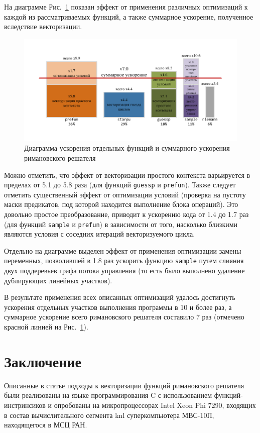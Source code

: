 \documentclass[utf8]{psta}
\begin{document}
На диаграмме Рис.~\ref{pic:perf} показан эффект от применения различных оптимизаций к каждой из рассматриваемых функций, а также суммарное ускорение, полученное вследствие векторизации.

\begin{figure}
\includegraphics[width=12cm]{pics/pic_perf}
\caption{Диаграмма ускорения отдельных функций и суммарного ускорения римановского решателя}
\label{pic:perf}
\end{figure}

Можно отметить, что эффект от векторизации простого контекста варьируется в пределах от 5.1 до 5.8 раза (для функций \texttt{guessp} и \texttt{prefun}).
Также следует отметить существенный эффект от оптимизации условий (проверка на пустоту маски предикатов, под которой находится выполнение блока операций).
Это довольно простое преобразование, приводит к ускорению кода от 1.4 до 1.7 раз (для функций \texttt{sample} и \texttt{prefun}) в зависимости от того, насколько близкими являются условия с соседних итераций векторизуемого цикла.

Отдельно на диаграмме выделен эффект от применения оптимизации замены переменных, позволившей в 1.8 раз ускорить функцию \texttt{sample} путем слияния двух поддеревьев графа потока управления (то есть было выполнено удаление дублирующих линейных участков).

В результате применения всех описанных оптимизаций удалось достигнуть ускорения отдельных участков выполнения программы в 10 и более раз, а суммарное ускорение всего римановского решателя составило 7 раз (отмечено красной линией на Рис.~\ref{pic:perf}).

\section*{Заключение}

Описанные в статье подходы к векторизации функций римановского решателя были реализованы на языке программирования C с использованием функций-инстринсиков и опробованы на микропроцессорах Intel Xeon Phi 7290, входящих в состав вычислительного сегмента knl суперкомпьютера МВС-10П, находящегося в МСЦ РАН.
\end{document}
